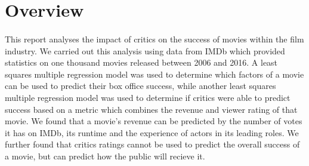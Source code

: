 \section{Overview}
    \paragraph{}
        This report analyses the impact of critics on the success of movies within the
            film industry.
        We carried out this analysis using data from IMDb which provided statistics on
            one thousand movies released between 2006 and 2016.
        A least squares multiple regression model was used to determine which factors
            of a movie can be used to predict their box office success, while another least
            squares multiple regression model was used to determine if critics were able to
            predict success based on a metric which combines the revenue and viewer rating
            of that movie.
        We found that a movie's revenue can be predicted by the number of votes it has
            on IMDb, its runtime and the experience of actors in its leading roles.
        We further found that critics ratings cannot be used to predict the overall
            success of a movie, but can predict how the public will recieve it.

